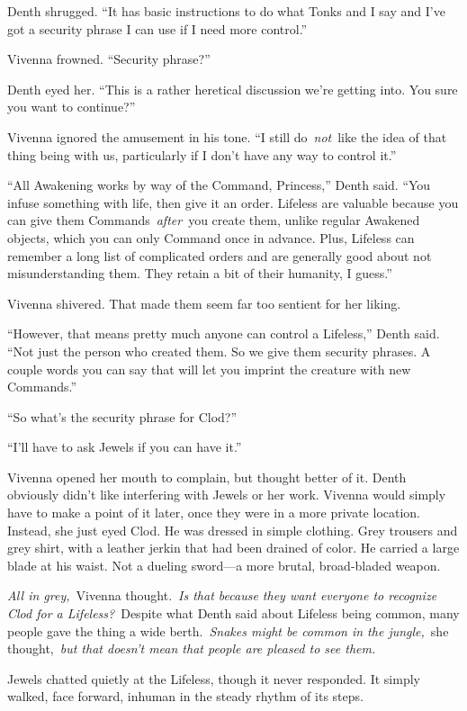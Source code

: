 Denth shrugged. “It has basic instructions to do what Tonks and I say and I’ve got a security phrase I can use if I need more control.”

Vivenna frowned. “Security phrase?”

Denth eyed her. “This is a rather heretical discussion we’re getting into. You sure you want to continue?”

Vivenna ignored the amusement in his tone. “I still do~\textit{not}~like the idea of that thing being with us, particularly if I don’t have any way to control it.”

“All Awakening works by way of the Command, Princess,” Denth said. “You infuse something with life, then give it an order. Lifeless are valuable because you can give them Commands~\textit{after}~you create them, unlike regular Awakened objects, which you can only Command once in advance. Plus, Lifeless can remember a long list of complicated orders and are generally good about not misunderstanding them. They retain a bit of their humanity, I guess.”

Vivenna shivered. That made them seem far too sentient for her liking.

“However, that means pretty much anyone can control a Lifeless,” Denth said. “Not just the person who created them. So we give them security phrases. A couple words you can say that will let you imprint the creature with new Commands.”

“So what’s the security phrase for Clod?”

“I’ll have to ask Jewels if you can have it.”

Vivenna opened her mouth to complain, but thought better of it. Denth obviously didn’t like interfering with Jewels or her work. Vivenna would simply have to make a point of it later, once they were in a more private location. Instead, she just eyed Clod. He was dressed in simple clothing. Grey trousers and grey shirt, with a leather jerkin that had been drained of color. He carried a large blade at his waist. Not a dueling sword—a more brutal, broad-bladed weapon.

\textit{All in grey,}~Vivenna thought.~\textit{Is that because they want everyone to recognize Clod for a Lifeless?}~Despite what Denth said about Lifeless being common, many people gave the thing a wide berth.~\textit{Snakes might be common in the jungle,}~she thought,~\textit{but that doesn’t mean that people are pleased to see them.}

Jewels chatted quietly at the Lifeless, though it never responded. It simply walked, face forward, inhuman in the steady rhythm of its steps.

